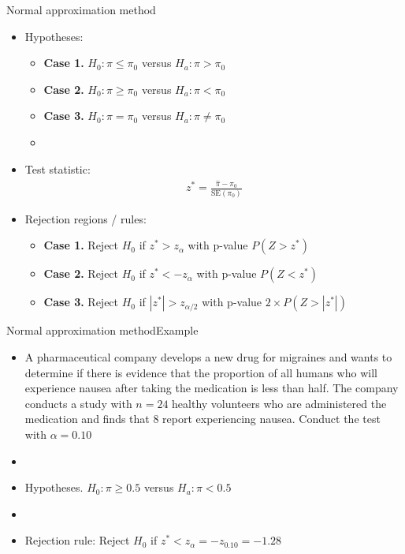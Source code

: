 \documentclass[xcolor=dvipsnames]{beamer}
\begin{document}
\begin{frame}{Normal approximation method}
	\begin{itemize}
		\item Hypotheses:  \pause
		\begin{itemize}
			\item \textbf{Case 1.} $H_0: \pi \leq \pi_0$ versus $H_a: \pi > \pi_0$  \pause
			\item \textbf{Case 2.} $H_0: \pi \geq \pi_0$ versus $H_a: \pi < \pi_0$  \pause
			\item \textbf{Case 3.} $H_0: \pi = \pi_0$ versus $H_a: \pi \neq \pi_0$  \pause
			\item[]
		\end{itemize}
		
		\item Test statistic:  \pause
		\begin{gather*}
		z^* = \frac{\hat{\pi}-\pi_0}{\text{SE}(\pi_0)}
		\end{gather*}  \pause
		
		\item Rejection regions / rules:  \pause
		\begin{itemize}
			\item \textbf{Case 1.} Reject $H_0$ if $z^* > z_{\alpha}$ with p-value $P(Z > z^*)$ \pause
			\item \textbf{Case 2.} Reject $H_0$ if $z^* < -z_{\alpha}$ with p-value $P(Z < z^*)$ \pause
			\item \textbf{Case 3.} Reject $H_0$ if $|z^*| > z_{\alpha / 2}$ with p-value $2\times P(Z > |z^*|)$
		\end{itemize}
	\end{itemize}
\end{frame}

\begin{frame}{Normal approximation method}{Example}
	\begin{itemize}
		\item A pharmaceutical company develops a new drug for migraines and wants to determine if there is evidence that the proportion of all humans who will experience nausea after taking the medication is less than half. The company conducts a study with $n = 24$ healthy volunteers who are administered the medication and finds that 8 report experiencing nausea. Conduct the test with $\alpha = 0.10$  \pause
		\item[]
		\item Hypotheses. $H_0: \pi \geq 0.5$ versus $H_a: \pi < 0.5$  \pause
		\item[]
		\item Rejection rule: Reject $H_0$ if $z^* < z_{\alpha} =  -z_{0.10} = -1.28$
	\end{itemize}
\end{frame}
\end{document}
